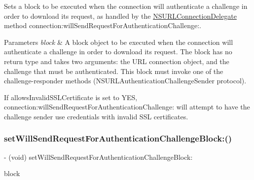 Sets a block to be executed when the connection will authenticate a challenge in order to download its request, as handled by the {\ttfamily \mbox{\hyperlink{class_n_s_u_r_l_connection_delegate-p}{N\+S\+U\+R\+L\+Connection\+Delegate}}} method {\ttfamily connection\+:will\+Send\+Request\+For\+Authentication\+Challenge\+:}.


\begin{DoxyParams}{Parameters}
{\em block} & A block object to be executed when the connection will authenticate a challenge in order to download its request. The block has no return type and takes two arguments\+: the U\+RL connection object, and the challenge that must be authenticated. This block must invoke one of the challenge-\/responder methods (N\+S\+U\+R\+L\+Authentication\+Challenge\+Sender protocol).\\
\hline
\end{DoxyParams}
If {\ttfamily allows\+Invalid\+S\+S\+L\+Certificate} is set to Y\+ES, {\ttfamily connection\+:will\+Send\+Request\+For\+Authentication\+Challenge\+:} will attempt to have the challenge sender use credentials with invalid S\+SL certificates. \mbox{\label{interface_a_f_u_r_l_connection_operation_a1b3cba1bf8db5763863c288ed04e4f31}} 
\subsubsection{\texorpdfstring{set\+Will\+Send\+Request\+For\+Authentication\+Challenge\+Block\+:()}{setWillSendRequestForAuthenticationChallengeBlock:()}\hspace{0.1cm}{\footnotesize\ttfamily [2/3]}}
{\footnotesize\ttfamily -\/ (void) set\+Will\+Send\+Request\+For\+Authentication\+Challenge\+Block\+: \begin{DoxyParamCaption}\item[{(nullable void($^\wedge$)(N\+S\+U\+R\+L\+Connection $\ast$connection, N\+S\+U\+R\+L\+Authentication\+Challenge $\ast$challenge))}]{block }\end{DoxyParamCaption}}


